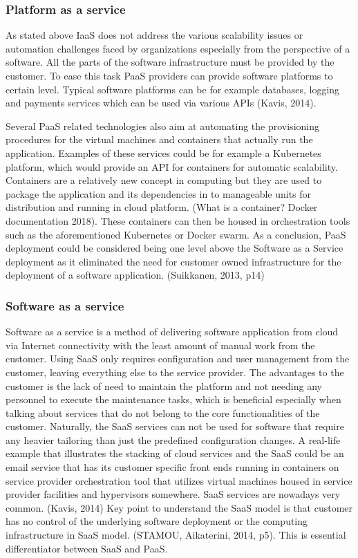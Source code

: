 \documentclass{article}
\begin{document}
\subsubsection{Platform as a service}
As stated above IaaS does not address the various scalability issues or automation challenges faced by organizations especially from the perspective of a software. All the parts of the software infrastructure must be provided by the customer. To ease this task PaaS providers can provide software platforms to certain level. Typical software platforms can be for example databases, logging and payments services which can be used via various APIs (Kavis, 2014).
\par
Several PaaS related technologies also aim at automating the provisioning procedures for the virtual machines and containers that actually run the application. Examples of these services could be for example a Kubernetes platform, which would provide an API for containers for automatic scalability. Containers are a relatively new concept in computing but they are used to package the application and its dependencies in to manageable units for distribution and running in cloud platform. (What is a container? Docker documentation 2018). These containers can then be housed in orchestration tools such as the aforementioned Kubernetes or Docker swarm.
As a conclusion, PaaS deployment could be considered being one level above the Software as a Service deployment as it eliminated the need for customer owned infrastructure for the deployment of a software application. (Suikkanen, 2013, p14)
\subsubsection{Software as a service}
Software as a service is a method of delivering software application from cloud via Internet connectivity with the least amount of manual work from the customer. Using SaaS only requires configuration and user management from the customer, leaving everything else to the service provider. The advantages to the customer is the lack of need to maintain the platform and not needing any personnel to execute the maintenance tasks, which is beneficial especially when talking about services that do not belong to the core functionalities of the customer. Naturally, the SaaS services can not be used for software that require any heavier tailoring than just the predefined configuration changes.
A real-life example that illustrates the stacking of cloud services and the SaaS could be an email service that has its customer specific front ends running in containers on service provider orchestration tool that utilizes virtual machines housed in service provider facilities and hypervisors somewhere. SaaS services are nowadays very common. (Kavis, 2014)
Key point to understand the SaaS model is that customer has no control of the underlying software deployment or the computing infrastructure in SaaS model. (STAMOU, Aikaterini, 2014, p5). This is essential differentiator between SaaS and PaaS.
\end{document}
